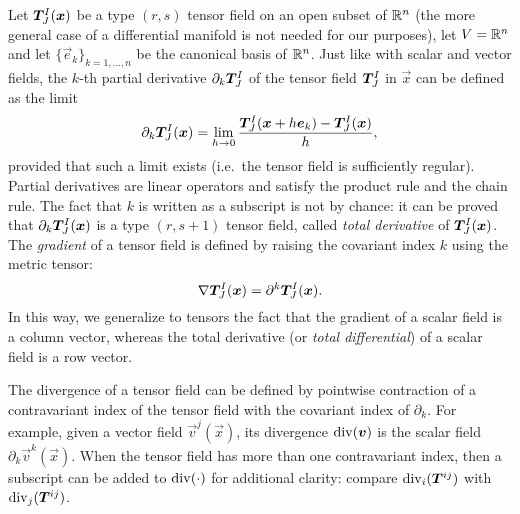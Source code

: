 Let $\bm{T}^I_J(\bm{x})$ be a type $(r,s)$ tensor field on an open subset
of $\mathbb{R}^n$ (the more general case of a differential manifold
is not needed for our purposes), let $V = \mathbb{R}^n$ and
let $\{\vec{e}_k\}_{k = 1,\dots,n}$ be the canonical basis of $\mathbb{R}^n$.
Just like with scalar and vector fields, the $k$-th partial derivative
$\partial_k \bm{T}^I_J$ of the tensor field $\bm{T}^I_J$ in $\vec{x}$
can be defined as the limit
\[
\partial_k \bm{T}^I_J(\bm{x})
= \lim_{h \to 0} \frac{
	\bm{T}^I_J(\bm{x}+h\bm{e}_k) - \bm{T}^I_J(\bm{x})
	}{h},
\]
provided that such a limit exists (i.e.\ the tensor field is sufficiently
regular). Partial derivatives are linear operators and satisfy the product
rule and the chain rule. The fact that $k$ is written as a subscript
is not by chance: it can be proved that $\partial_k \bm{T}^I_J(\bm{x})$
is a type $(r,s+1)$ tensor field, called \emph{total derivative}
of $\bm{T}^I_J(\bm{x})$. The \emph{gradient} of a tensor field is
defined by raising the covariant index $k$ using the metric tensor:
\[
\nabla \bm{T}^I_J(\bm{x}) = \partial^k \bm{T}^I_J(\bm{x}).
\]
In this way, we generalize to tensors the fact that the gradient of
a scalar field is a column vector, whereas the total derivative
(or \emph{total differential}) of a scalar field is a row vector.

The divergence of a tensor field can be defined by pointwise
contraction of a contravariant index of the tensor field with
the covariant index of $\partial_k$. For example, given a vector
field $\vec{v}^j(\vec{x})$, its divergence $\operatorname{div}(\bm{v})$
is the scalar field $\partial_k \vec{v}^k(\vec{x})$.
When the tensor field has more than one contravariant index, then
a subscript can be added to $\operatorname{div}(\cdot)$ for additional clarity:
compare $\operatorname{div}_i(\bm{T}^{ij})$ with $\operatorname{div}_j(\bm{T}^{ij})$.



















